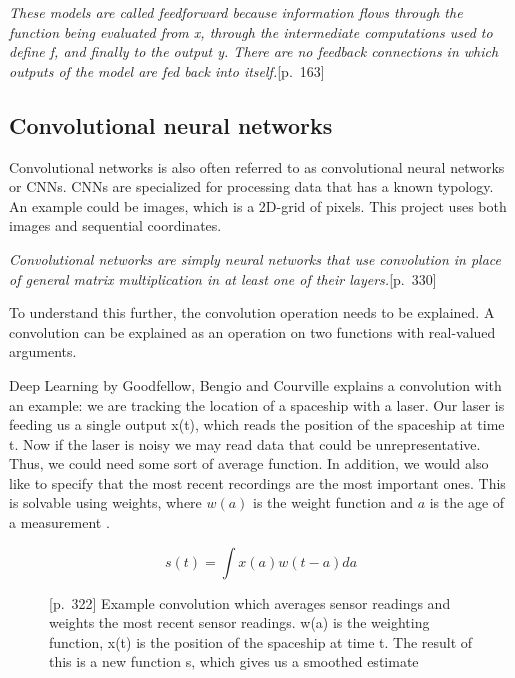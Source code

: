 \begin{displayquote}
\textit{These models are called feedforward because information flows through the function being evaluated from x, through the intermediate computations used to define f, and finally to the output y. There are no feedback connections in which outputs of the model are fed back into itself.}{\cite{goodfellow_deep_2016}[p.~163]}
\end{displayquote}

\subsection{Convolutional neural networks}

Convolutional networks \cite{lecun_generalization_1989} is also often referred to as convolutional neural networks or CNNs. CNNs are specialized for processing data that has a known typology. An example could be images, which is a 2D-grid of pixels. This project uses both images and sequential coordinates.

\begin{displayquote}
 \textit{Convolutional networks are simply neural networks that use convolution in place of general matrix multiplication in at least one of their layers.}{\cite{goodfellow_deep_2016}[p.~330]}
\end{displayquote}
To understand this further, the convolution operation needs to be explained. A convolution can be explained as an operation on two functions with real-valued arguments. 

Deep Learning by Goodfellow, Bengio and Courville explains a convolution with an example: we are tracking the location of a spaceship with a laser. Our laser is feeding us a single output x(t), which reads the position of the spaceship at time t. Now if the laser is noisy we may read data that could be unrepresentative. Thus, we could need some sort of average function. In addition, we would also like to specify that the most recent recordings are the most important ones. This is solvable using weights, where $w(a)$ is the weight function and $a$ is the age of a measurement \cite{goodfellow_deep_2016}.

\begin{figure}[H]
    \label{eqn:conv}
    \begin{equation}
    s(t) = \int x(a)w(t-a)da
    \end{equation}
    \caption{\cite{goodfellow_deep_2016}[p.~322] Example convolution which averages sensor readings and weights the most recent sensor readings. w(a) is the weighting function, x(t) is the position of the spaceship at time t. The result of this is a new function s, which gives us a smoothed estimate}
\end{figure}

